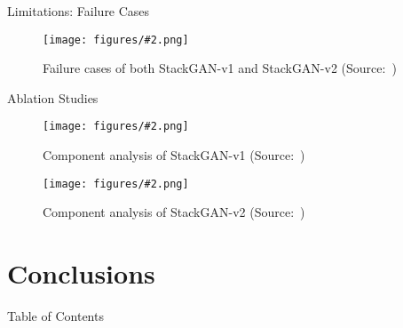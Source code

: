 \documentclass{beamer}
\newcommand{\paperfigure}[3][width=\textwidth]{%
    \begin{figure}%
        \centering%
        \texttt{[image: figures/\#2.png]}%
        \caption{#3 (Source:~\cite{stackgan++})}%
    \end{figure}%
}
\begin{document}
\begin{frame}{Limitations: Failure Cases}
    \paperfigure[width=\textwidth]{failure_cases}{Failure cases of both StackGAN-v1 and StackGAN-v2}
\end{frame}

\begin{frame}{Ablation Studies}
    \paperfigure[width=0.5\textwidth]{ablation_v1}{Component analysis of StackGAN-v1}
    \paperfigure[width=0.9\textwidth]{ablation_v2}{Component analysis of StackGAN-v2}
\end{frame}


\section{Conclusions}
\begin{frame}{Table of Contents}
    \tableofcontents[currentsection]
\end{frame}
\end{document}

